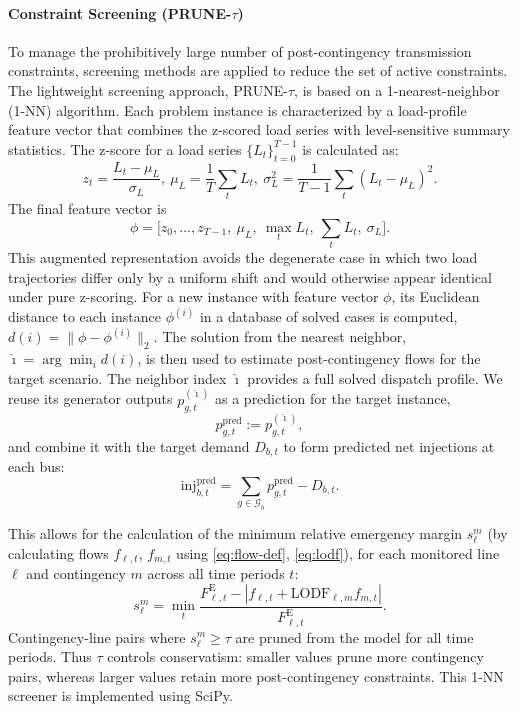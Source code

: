 \documentclass[runningheads]{llncs}
\begin{document}
\paragraph{Constraint Screening (PRUNE-$\tau$)}
To manage the prohibitively large number of post-contingency transmission constraints, screening methods are applied to reduce the set of active constraints. The lightweight screening approach, PRUNE-$\tau$, is based on a 1-nearest-neighbor (1-NN) algorithm. Each problem instance is characterized by a load-profile feature vector that combines the z-scored load series with level-sensitive summary statistics. The z-score for a load series $\{L_t\}_{t=0}^{T-1}$ is calculated as:
\begin{equation}
z_t=\frac{L_t-\mu_L}{\sigma_L}, \ \mu_L=\frac{1}{T}\sum_t L_t, \ \sigma_L^2=\frac{1}{T-1}\sum_t(L_t-\mu_L)^2.
\end{equation}
The final feature vector is
\begin{equation}
\phi=\big[z_0,\dots,z_{T-1},\ \mu_L,\ \max_t L_t,\ \sum_t L_t,\ \sigma_L\big].
\end{equation}
This augmented representation avoids the degenerate case in which two load trajectories differ only by a uniform shift and would otherwise appear identical under pure z-scoring. For a new instance with feature vector $\phi$, its Euclidean distance to each instance $\phi^{(i)}$ in a database of solved cases is computed, $d(i)=\big\|\phi-\phi^{(i)}\big\|_2$. The solution from the nearest neighbor, $\hat{\imath}=\arg\min_i d(i)$, is then used to estimate post-contingency flows for the target scenario. The neighbor index $\hat{\imath}$ provides a full solved dispatch profile. We reuse its generator outputs
$p^{(\hat{\imath})}_{g,t}$ as a prediction for the target instance,
\begin{equation}
p^{\mathrm{pred}}_{g,t} := p^{(\hat{\imath})}_{g,t},
\end{equation}
and combine it with the target demand $D_{b,t}$ to form predicted net injections at each bus:
\begin{equation}
\mathrm{inj}^{\mathrm{pred}}_{b,t}=\sum_{g\in\mathcal{G}_b} p^{\mathrm{pred}}_{g,t} - D_{b,t}.
\end{equation}

This allows for the calculation of the minimum relative emergency margin $s^{m}_{\ell}$ (by calculating flows $f_{\ell,t}$, $f_{m,t}$ using \eqref{eq:flow-def}, \eqref{eq:lodf}), for each monitored line $\ell$ and contingency $m$ across all time periods $t$:
\begin{equation}
s^{m}_{\ell}=\min_t \frac{F^{\mathrm{E}}_{\ell,t}-|f_{\ell,t}+\mathrm{LODF}_{\ell,m}f_{m,t}|}{F^{\mathrm{E}}_{\ell,t}}.
\end{equation}
Contingency-line pairs where $s_{\ell}^m \ge \tau$ are pruned from the model for all time periods. Thus $\tau$ controls conservatism: smaller values prune more contingency pairs, whereas larger values retain more post-contingency constraints. This 1-NN screener is implemented using SciPy.
\end{document}
